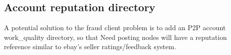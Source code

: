 \documentclass[12pt]{article}
\begin{document}
\subsection{Account reputation directory}
A potential solution to the fraud client problem is to add an P2P account work\_quality directory, so that Need posting nodes will have a reputation reference similar to ebay's seller ratings/feedback system.

\begin{thebibliography}{9}
\end{thebibliography}

	
\end{document}

